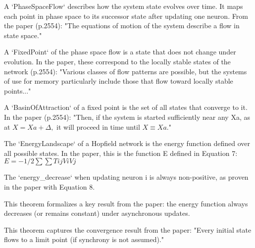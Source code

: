 \begin{definition}\label{PhaseSpaceFlow}
\leanok
A `PhaseSpaceFlow` describes how the system state evolves over time.
It maps each point in phase space to its successor state after updating one neuron.
From the paper (p.2554): "The equations of motion of the system describe a flow in state space."
\end{definition}


\begin{definition}\label{FixedPoint}
\leanok
A `FixedPoint` of the phase space flow is a state that does not change under evolution.
In the paper, these correspond to the locally stable states of the network (p.2554):
"Various classes of flow patterns are possible, but the systems of use for memory
particularly include those that flow toward locally stable points..."
\end{definition}


\begin{definition}\label{BasinOfAttraction}
\leanok
A `BasinOfAttraction` of a fixed point is the set of all states that converge to it.
In the paper (p.2554): "Then, if the system is started sufficiently near any Xa,
as at $X = Xa + \Delta,$ it will proceed in time until $X \equiv Xa.$"
\end{definition}


\begin{definition}\label{EnergyLandscape}
\leanok
The `EnergyLandscape` of a Hopfield network is the energy function defined over all possible states.
In the paper, this is the function E defined in Equation 7:
   $ E = -1/2 \sum \sum Tij Vi Vj$
\end{definition}


\begin{definition}\label{energy_decrease}
\leanok
The `energy\_decrease` when updating neuron i is always non-positive,
as proven in the paper with Equation 8.

This theorem formalizes a key result from the paper: the energy function
always decreases (or remains constant) under asynchronous updates.
\end{definition}


\begin{definition}\label{convergence_to_fixed_point}
\leanok
This theorem captures the convergence result from the paper:
"Every initial state flows to a limit point (if synchrony is not assumed)."
\end{definition}

